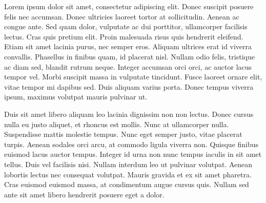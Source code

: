 

Lorem ipsum dolor sit amet, consectetur adipiscing elit. Donec suscipit posuere felis nec accumsan. Donec ultricies laoreet tortor at sollicitudin. Aenean ac congue ante. Sed quam dolor, vulputate ac dui porttitor, ullamcorper facilisis lectus. Cras quis pretium elit. Proin malesuada risus quis hendrerit eleifend. Etiam sit amet lacinia purus, nec semper eros. Aliquam ultrices erat id viverra convallis. Phasellus in finibus quam, id placerat nisl. Nullam odio felis, tristique ac diam sed, blandit rutrum neque. Integer accumsan orci orci, ac auctor lacus tempor vel. Morbi suscipit massa in vulputate tincidunt. Fusce laoreet ornare elit, vitae tempor mi dapibus sed. Duis aliquam varius porta. Donec tempus viverra ipsum, maximus volutpat mauris pulvinar ut.

Duis sit amet libero aliquam leo lacinia dignissim non non lectus. Donec cursus nulla eu justo aliquet, et rhoncus est mollis. Nunc at ullamcorper nulla. Suspendisse mattis molestie tempus. Nunc eget semper justo, vitae placerat turpis. Aenean sodales orci arcu, at commodo ligula viverra non. Quisque finibus euismod lacus auctor tempus. Integer id urna non nunc tempus iaculis in sit amet tellus. Duis vel facilisis nisi. Nullam interdum leo ut pulvinar volutpat. Aenean lobortis lectus nec consequat volutpat. Mauris gravida et ex sit amet pharetra. Cras euismod euismod massa, at condimentum augue cursus quis. Nullam sed ante sit amet libero hendrerit posuere eget a dolor. 